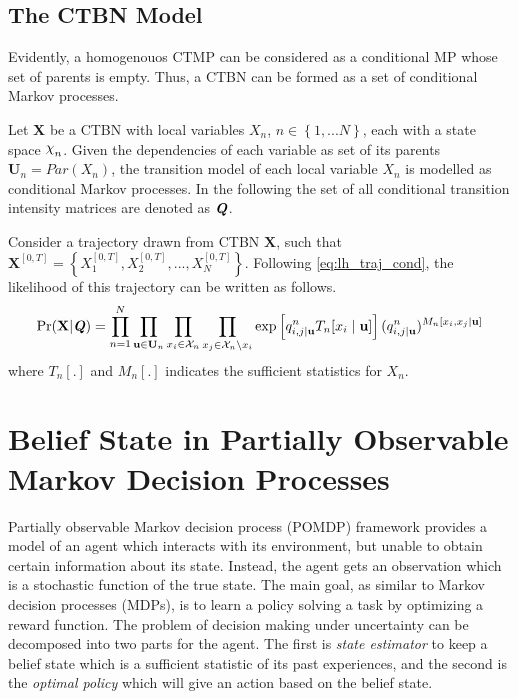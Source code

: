 \subsection{The CTBN Model}
Evidently, a homogenouos CTMP can be considered as a conditional MP whose set of parents is empty. Thus, a CTBN can be formed as a set of conditional Markov processes.

Let \textbf{X} be a CTBN with local variables $ X_n $, $ n \in \left\lbrace 1,...N \right\rbrace $, each with a state space $ \rchi_n $. Given the dependencies of each variable as set of its parents $ \textbf{U}_n = Par(X_n) $, the transition model of each local variable $ X_n $ is modelled as conditional Markov processes. \cite{Nodelman1995} In the following the set of all conditional transition intensity matrices are denoted as $ \textbf{\textit{Q}} $.

Consider a trajectory drawn from CTBN $ \textbf{X} $, such that $ \textbf{X}^{[0, T]} = \left\lbrace X_1^{[0,T]},  X_2^{[0,T]}, ...,  X_N^{[0,T]}\right\rbrace  $. Following \autoref{eq:lh_traj_cond}, the likelihood of this trajectory can be written as follows.
\begin{align}
\operatorname{Pr}( \textbf{X}  | \textbf{\textit{Q}} ) = \prod_{n=1}^{N} \prod_{\textbf{u} \in \mathcal{\textbf{U}}_{n}} \prod_{x_i \in \mathcal{X}_{n}} \prod_{x_j \in \mathcal{X}_{n} \backslash x_i}
\exp \left[q_{i,j\mid \textbf{u}}^{n} T_{n}[x_i\mid \textbf{u}]\right] (q_{i,j\mid \textbf{u}}^{n})^{M_{n}[x_i, x_j\mid \textbf{u}]}
\label{eq:lh_CTBN}
\end{align}
where $ T_n[.] $ and $ M_n[.] $ indicates the sufficient statistics for $ X_n $.

\section{Belief State in Partially Observable Markov Decision Processes}
\label{sec:belief_POMDP}
Partially observable Markov decision process (POMDP) framework provides a model of an agent which interacts with its environment, but unable to obtain certain information about its state. Instead, the agent gets an observation which is a stochastic function of the true state. The main goal, as similar to Markov decision processes (MDPs), is to learn a policy solving a task by optimizing a reward function. The problem of decision making under uncertainty can be decomposed into two parts for the agent. The first is \textit{state estimator} to keep a belief state which is a sufficient statistic of its past experiences, and the second is the \textit{optimal policy} which will give an action based on the belief state. \cite{Murphy2000,KAELBLING199899}

